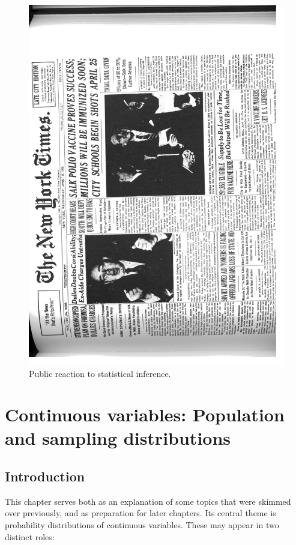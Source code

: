 \documentclass[11pt,a4paper,openany]{book}
\begin{document}
\begin{figure}[htbp]
\centering
\includegraphics[width=15.00000cm]{salk_nytimes.pdf}
\caption{\label{fig:f-nytimes} Public reaction to statistical inference.}
\end{figure}

\chapter{Continuous variables: Population and sampling
distributions}\label{c-contd}

\section{Introduction}\label{s-contd-intro}

This chapter serves both as an explanation of some topics that were
skimmed over previously, and as preparation for later chapters. Its
central theme is probability distributions of continuous variables.
These may appear in two distinct roles:
\end{document}
